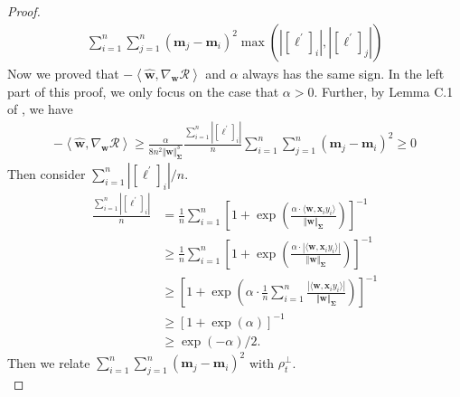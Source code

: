 \documentclass[pdflatex,sn-basic]{sn-jnl}%
\theoremstyle{thmstyleone}%
\begin{document}
\begin{appendices}
\begin{proof}
\begin{equation*}
\begin{aligned}
    \sum_{i=1}^{n} \sum_{j=1}^{n}
    \left(
      \mathbf{m}_j -  \mathbf{m}_i 
    \right)^2
    \max\left(
      | [\boldsymbol{\ell^{\prime}}]_{i} |, 
      | [\boldsymbol{\ell^{\prime}}]_{j} |
    \right)
  \end{aligned}
  \end{equation*}
  Now we proved that $- \left\langle \hat{\mathbf{w}}, \nabla_{\mathbf{w}} \mathcal{R} \right\rangle$ and 
  $\alpha$ always has the same sign. 
  In the left part of this proof, we only focus on the case that $\alpha > 0$.
  Further, by Lemma C.1 of \citep{implicit_bias_BN}, we have 
  \begin{equation}\label{eq:inner_product_pairwise_lower}
  \begin{aligned}
    - \left\langle \hat{\mathbf{w}}, \nabla_{\mathbf{w}} \mathcal{R} \right\rangle 
    \ge 
    \frac{\alpha}{8 n^2 \Vert \mathbf{w} \Vert_{\mathbf{\Sigma}}^3}
    \frac{\sum_{i=1}^{n} | [\boldsymbol{\ell^{\prime}}]_{i} |}{n}
    \sum_{i=1}^{n} \sum_{j=1}^{n}
    \left(
      \mathbf{m}_j -  \mathbf{m}_i 
    \right)^2
    \ge 0
  \end{aligned}
  \end{equation}
  Then consider ${\sum_{i=1}^{n} | [\boldsymbol{\ell^{\prime}}]_{i} |}/{n}$.
  \begin{equation}\label{eq:avg_logit_derivative_lower}
  \begin{aligned}
    \frac{\sum_{i=1}^{n} | [\boldsymbol{\ell^{\prime}}]_{i} |}{n}
    & = 
    \frac{1}{n} \sum_{i=1}^{n} \left[ 1 + \exp \left( \frac{\alpha \cdot \langle \mathbf{w}, \mathbf{x}_i y_i \rangle}
      {\Vert \mathbf{w} \Vert_{\mathbf{\Sigma}}} 
    \right)
    \right]^{-1}
    \\ & \geq 
    \frac{1}{n} \sum_{i=1}^{n} \left[ 1 + \exp \left( \frac{\alpha \cdot |\langle \mathbf{w}, \mathbf{x}_i y_i \rangle|}
    {\Vert \mathbf{w} \Vert_{\mathbf{\Sigma}}} \right) \right]^{-1}
    \\ & \geq \left[ 1 + \exp \left( \alpha \cdot \frac{1}{n} \sum_{i=1}^{n} 
    \frac{|\langle \mathbf{w}, \mathbf{x}_i y_i \rangle|}{\Vert \mathbf{w} \Vert_{\mathbf{\Sigma}}} \right) \right]^{-1}
    \\ & \geq [1 + \exp(\alpha)]^{-1}
    \\ & \geq \exp(- \alpha) / 2.
  \end{aligned}
  \end{equation}
  Then we relate $\sum_{i=1}^{n} \sum_{j=1}^{n}
  \left(
    \mathbf{m}_j -  \mathbf{m}_i 
  \right)^2$ with $\rho_t^{\perp}$.
  \begin{equation*}

\end{equation*}
\end{proof}
\end{appendices}
\end{document}
